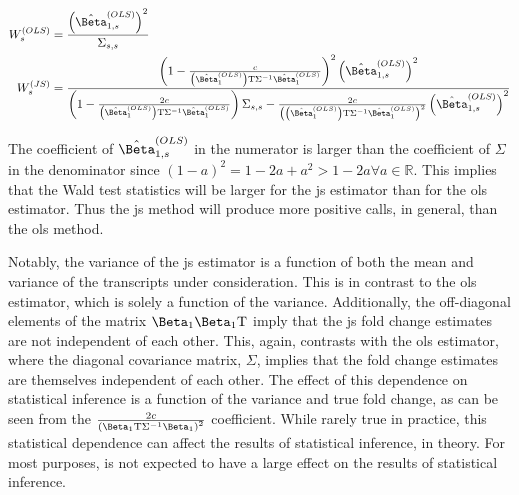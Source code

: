 \begin{align}
  W_s^{(OLS)} & = \frac{ \left( \hat{\Beta}_{1, s}^{(OLS)} \right)^2 }{ \Sigma_{s,s} } \\
  W_s^{(JS)}  & = \frac{
  \left( 1 - \frac{ c }{ \left( \hat{\Beta}_1^{(OLS)} \right)\tran \Sigma^{-1} \hat{\Beta}_1^{(OLS)} } \right)^2 \left( \hat{\Beta}_{1, s}^{(OLS)} \right)^2
  }{
  \left(1 - \frac{2c}{ \left( \hat{\Beta}_1^{(OLS)} \right)\tran \Sigma^{-1} \hat{\Beta}_1^{(OLS)}} \right) \Sigma_{s,s}
  - \frac{2c}{\left( \left( \hat{\Beta}_1^{(OLS)} \right)\tran \Sigma^{-1} \hat{\Beta}_1^{(OLS)} \right)^2} \left( \hat{\Beta}_{1, s}^{(OLS)} \right)^2
  }
\end{align}

The coefficient of $\hat{\Beta}_{1,s}^{(OLS)}$ in the numerator is larger than the coefficient of $\Sigma$ in the denominator since $(1 - a)^2 = 1 - 2a + a^2 > 1 - 2a \forall a \in \mathbb{R}$.
This implies that the Wald test statistics will be larger for the \gls{js} estimator than for the \gls{ols} estimator.
Thus the \gls{js} method will produce more positive calls, in general, than the \gls{ols} method.

Notably, the variance of the \gls{js} estimator is a function of both the mean and variance of the transcripts under consideration.
This is in contrast to the \gls{ols} estimator, which is solely a function of the variance.
Additionally, the off-diagonal elements of the matrix $\Beta_1 \Beta_1\tran$ imply that the \gls{js} fold change estimates are not independent of each other.
This, again, contrasts with the \gls{ols} estimator, where the diagonal covariance matrix, $\Sigma$, implies that the fold change estimates are themselves independent of each other.
The effect of this dependence on statistical inference is a function of the variance and true fold change, as can be seen from the $\frac{2c}{\left( \Beta_1\tran \Sigma^{-1} \Beta_1 \right)^2}$ coefficient.
While rarely true in practice, this statistical dependence can affect the results of statistical inference, in theory.
For most purposes, is not expected to have a large effect on the results of statistical inference.
